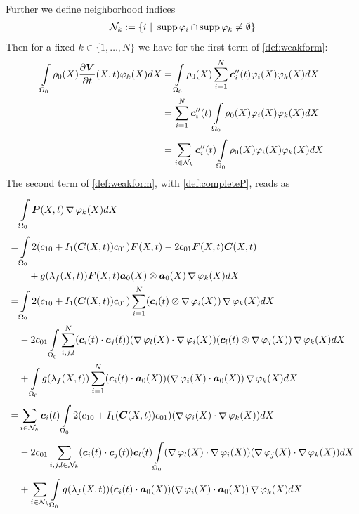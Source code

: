 \documentclass[a4paper,12pt]{article}
\newcommand{\Nk}{\mathcal{N}_k}
\newcommand{\Or}{\Omega_0}
\newcommand{\intor}{\intl{\Or}{}}
\DeclareMathOperator{\divergence}{\nabla}
\DeclareMathOperator{\supp}{supp}
\newcommand{\sumnk}{\suml{i\in{\Nk}}{}}
\begin{document}
Further we define neighborhood indices
\begin{align}
	\Nk := \{i ~|~ \supp\varphi_i \cap \supp\varphi_k \neq\es\}
\end{align}
Then for a fixed $k\in\{1,\ldots, N\}$ we have for the first term of \eqref{def:weakform}:
\begin{align*}
	\intor \rho_0(X)\d{\vV}{t}(X,t)\varphi_k(X)dX 
		&= \intor \rho_0(X)\sumi \vc_i''(t)\varphi_i(X)\varphi_k(X)dX\\
		&= \sumi \vc_i''(t) \intor \rho_0(X)\varphi_i(X)\varphi_k(X)dX\\
		&= \sumnk \vc_i''(t) \intor \rho_0(X)\varphi_i(X)\varphi_k(X)dX
\end{align*}
The second term of \eqref{def:weakform}, with \eqref{def:completeP}, reads as
\begin{align*}
	&\intor\vP(X,t)\divergence\varphi_k(X) dX\\ 
		=& \intor2(c_{10} + I_1(\vC(X,t))c_{01})\vF(X,t) - 2c_{01}\vF(X,t)\vC(X,t)\\
		&\quad+g(\lambda_f(X,t))\vF(X,t)\va_0(X)\otimes\va_0(X)\divergence\varphi_k(X)dX\\
		=& \intor2(c_{10} + I_1(\vC(X,t))c_{01})\sumi (\vc_i(t)\otimes \divergence\varphi_i(X))\divergence\varphi_k(X)dX\\
		&-2c_{01}\intor\suml{i,j,l}{N}(\vc_i(t)\cdot \vc_j(t))(\divergence\varphi_l(X)\cdot\divergence\varphi_i(X))(\vc_l(t)\otimes\divergence\varphi_j(X))\divergence\varphi_k(X)dX\\
		&+\intor g(\lambda_f(X,t))\sumi (\vc_i(t)\cdot \va_0(X))(\divergence\varphi_i(X)\cdot\va_0(X))\divergence\varphi_k(X)dX\\
		=& \sumnk\vc_i(t)\intor2(c_{10} + I_1(\vC(X,t))c_{01})(\divergence\varphi_i(X)\cdot\divergence\varphi_k(X))dX\\
		&-2c_{01}\suml{i,j,l\in\Nk}{}(\vc_i(t)\cdot \vc_j(t))\vc_l(t)
		\intor(\divergence\varphi_l(X)\cdot\divergence\varphi_i(X))(\divergence\varphi_j(X)\cdot\divergence\varphi_k(X))dX\\
		&+\sumnk \intor g(\lambda_f(X,t))(\vc_i(t)\cdot \va_0(X))(\divergence\varphi_i(X)\cdot\va_0(X))\divergence\varphi_k(X)dX
\end{align*}



\end{document}
